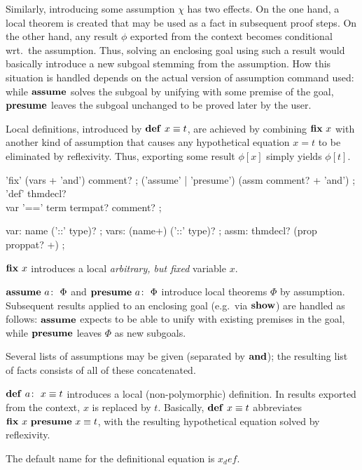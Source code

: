 Similarly, introducing some assumption $\chi$ has two effects.  On the one
hand, a local theorem is created that may be used as a fact in subsequent
proof steps.  On the other hand, any result $\phi$ exported from the context
becomes conditional wrt.\ the assumption.  Thus, solving an enclosing goal
using such a result would basically introduce a new subgoal stemming from the
assumption.  How this situation is handled depends on the actual version of
assumption command used: while ${\mathord{\mathbf{assume}}}$ solves the subgoal by unifying
with some premise of the goal, ${\mathord{\mathbf{presume}}}$ leaves the subgoal unchanged to
be proved later by the user.

Local definitions, introduced by $\DEF{}{x \equiv t}$, are achieved by
combining ${\mathord{\mathbf{fix}}}~x$ with another kind of assumption that causes any
hypothetical equation $x = t$ to be eliminated by reflexivity.  Thus,
exporting some result $\phi[x]$ simply yields $\phi[t]$.

\begin{rail}
  'fix' (vars + 'and') comment?
  ;
  ('assume' | 'presume') (assm comment? + 'and')
  ;
  'def' thmdecl? \\ var '==' term termpat? comment?
  ;

  var: name ('::' type)?
  ;
  vars: (name+) ('::' type)?
  ;
  assm: thmdecl? (prop proppat? +)
  ;
\end{rail}

\begin{descr}
\item [${\mathord{\mathbf{fix}}}~x$] introduces a local \emph{arbitrary, but fixed} variable $x$.
\item [$\ASSUME{a}{\Phi}$ and $\PRESUME{a}{\Phi}$] introduce local theorems
  $\Phi$ by assumption.  Subsequent results applied to an enclosing goal
  (e.g.\ via ${\mathord{\mathbf{show}}}$) are handled as follows: ${\mathord{\mathbf{assume}}}$ expects to be
  able to unify with existing premises in the goal, while ${\mathord{\mathbf{presume}}}$
  leaves $\Phi$ as new subgoals.
  
  Several lists of assumptions may be given (separated by
  ${\mathord{\mathbf{and}}}$); the resulting list of facts consists of all of these
  concatenated.
\item [$\DEF{a}{x \equiv t}$] introduces a local (non-polymorphic) definition.
  In results exported from the context, $x$ is replaced by $t$.  Basically,
  $\DEF{}{x \equiv t}$ abbreviates $\FIX{x}~\PRESUME{}{x \equiv t}$, with the
  resulting hypothetical equation solved by reflexivity.
  
  The default name for the definitional equation is $x_def$.
\end{descr}

